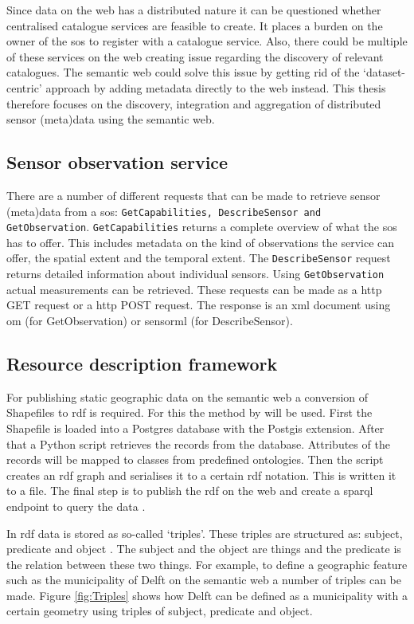 Since data on the web has a distributed nature it can be questioned whether centralised catalogue services are feasible to create. It places a burden on the owner of the \ac{sos} to register with a catalogue service. Also, there could be multiple of these services on the web creating issue regarding the discovery of relevant catalogues. The semantic web could solve this issue by getting rid of the `dataset-centric' approach by adding metadata directly to the web instead. This thesis therefore focuses on the discovery, integration and aggregation of distributed sensor (meta)data using the semantic web.

\subsection{Sensor observation service}
There are a number of different requests that can be made to retrieve sensor (meta)data from a \ac{sos}: \texttt{GetCapabilities, DescribeSensor and GetObservation}. \texttt{GetCapabilities} returns a complete overview of what the \ac{sos} has to offer. This includes metadata on the kind of observations the service can offer, the spatial extent and the temporal extent. The  \texttt{DescribeSensor} request returns detailed information about individual sensors. Using \texttt{GetObservation} actual measurements can be retrieved. These requests can be made as a \ac{http} GET request or a \ac{http} POST request. The response is an \ac{xml} document using \ac{om} (for GetObservation) or \ac{sensorml} (for DescribeSensor).

\subsection{Resource description framework}
For publishing static geographic data on the semantic web a conversion of Shapefiles to \ac{rdf} is required. For this the method by \cite{LD:Missier} will be used. First the Shapefile is loaded into a Postgres database with the Postgis extension. After that a Python script retrieves the records from the database. Attributes of the records will be mapped to classes from predefined ontologies. Then the script creates an \ac{rdf} graph and serialises it to a certain \ac{rdf} notation. This is written it to a file. The final step is to publish the \ac{rdf} on the web and create a \ac{sparql} endpoint to query the data \citep{LD:Missier}. 

In \ac{rdf} data is stored as so-called `triples'. These triples are structured as: subject, predicate and object \citep{LD:Berners-lee}. The subject and the object are things and the predicate is the relation between these two things. For example, to define a geographic feature such as the municipality of Delft on the semantic web a number of triples can be made. Figure \ref{fig:Triples} shows how Delft can be defined as a municipality with a certain geometry using triples of subject, predicate and object.

